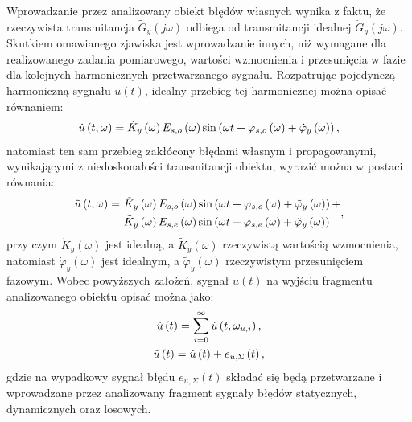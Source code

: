 Wprowadzanie przez analizowany obiekt błędów własnych wynika z faktu, że rzeczywista transmitancja $\tilde{G}_{y}(j\omega)$ odbiega od transmitancji idealnej $\dot{G}_{y}(j\omega)$. Skutkiem omawianego zjawiska jest wprowadzanie innych, niż wymagane dla realizowanego zadania pomiarowego, wartości wzmocnienia i przesunięcia w fazie dla kolejnych harmonicznych przetwarzanego sygnału. Rozpatrując pojedynczą harmoniczną sygnału $u(t)$, idealny przebieg tej harmonicznej można opisać równaniem:
\begin{equation}
\dot{u} \left(t,\omega\right) = \dot{K}_{y} \left(\omega\right) E_{s,o} \left(\omega\right) \sin \left( \omega t + \varphi_{s,o} \left(\omega\right) + \dot{\varphi}_{y} \left(\omega\right) \right) \label{eq:mid_cont_omega_ideal},
\end{equation}
natomiast ten sam przebieg zakłócony błędami własnym i propagowanymi, wynikającymi z niedoskonałości transmitancji obiektu, wyrazić można w postaci równania:
\begin{equation}
\begin{split}
\tilde{u} \left(t,\omega\right) =~
& \tilde{K}_{y} \left(\omega\right) E_{s,o} \left(\omega\right) \sin \left( \omega t + \varphi_{s,o} \left(\omega\right) + \tilde{\varphi}_{y} \left(\omega\right) \right) + \\
& \tilde{K}_{y} \left(\omega\right) E_{s,e} \left(\omega\right) \sin \left( \omega t + \varphi_{s,e} \left(\omega\right) + \tilde{\varphi}_{y} \left(\omega\right) \right)
\end{split}
\label{eq:mid_cont_omega_real},
\end{equation}
przy czym $\dot{K}_{y}(\omega)$ jest idealną, a $\tilde{K}_{y}(\omega)$ rzeczywistą wartością wzmocnienia, natomiast $\dot{\varphi}_{y}(\omega)$ jest idealnym, a $\tilde{\varphi}_{y}(\omega)$ rzeczywistym przesunięciem fazowym. Wobec powyższych założeń, sygnał $u(t)$ na wyjściu fragmentu analizowanego obiektu opisać można jako:
\begin{gather}
\dot{u} \left(t\right) = \sum _{i = 0} ^{\infty} \dot{u} \left( t, \omega_{u,i} \right) \label{eq:mid_cont_sum_ideal}, \\
\tilde{u} \left(t\right) = \dot{u} \left(t\right) + e_{u,\Sigma} \left(t\right) \label{eq:mid_cont_sum_real},
\end{gather}
gdzie na wypadkowy sygnał błędu $e_{u,\Sigma}(t)$ składać się będą przetwarzane i wprowadzane przez analizowany fragment sygnały błędów statycznych, dynamicznych oraz losowych.

